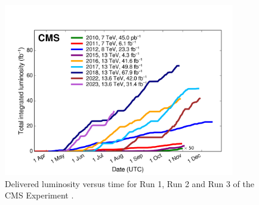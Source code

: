 \begin{figure}[!htp]
\centering
\includegraphics[width=0.9\textwidth]{ashish_thesis/CMS_luminosity.png}
\caption[CMS Integrated luminosity]{%
    Delivered luminosity versus time for Run 1, Run 2 and Run 3 of the CMS Experiment \cite{wikicern_cc}.
}
\label{fig:lumi}
\end{figure}



